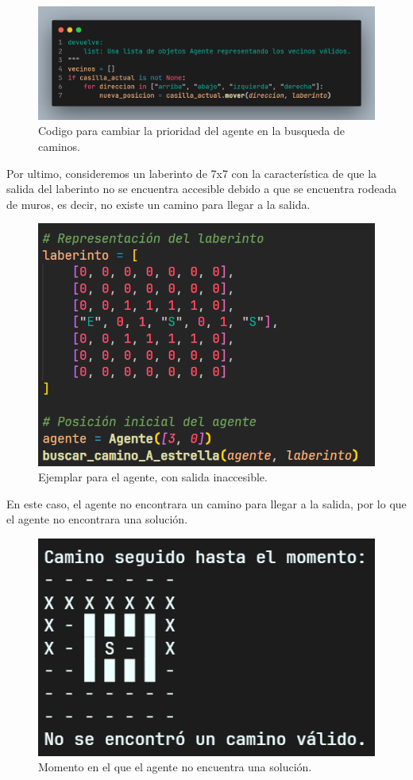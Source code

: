 \begin{figure}[H]
    \centering
    \includegraphics[width=0.65\linewidth]{IMA/Situacion1.png} 
    \caption{Codigo para cambiar la prioridad del agente en la busqueda de caminos.} 
    \label{fig:ejemplo} 
\end{figure}

Por ultimo, consideremos un laberinto de 7x7 con la característica de que la salida del laberinto no 
se encuentra accesible debido a que se encuentra rodeada de muros, es decir, no existe un camino para llegar a la salida.

\begin{figure}[H]
    \centering
    \includegraphics[width=0.5\linewidth]{IMA/Laberinto3.png} 
    \caption{Ejemplar para el agente, con salida inaccesible.} 
    \label{fig:ejemplo} 
\end{figure}

En este caso, el agente no encontrara un camino para llegar a la salida, por lo que el agente no encontrara una solución.

\begin{figure}[H]
    \centering
    \includegraphics[width=0.5\linewidth]{IMA/RLaberinto3.png} 
    \caption{Momento en el que el agente no encuentra una solución.} 
    \label{fig:ejemplo} 
\end{figure}

